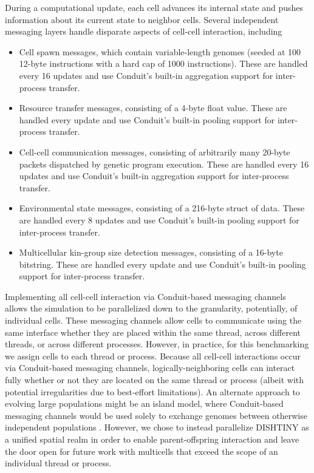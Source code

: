 During a computational update, each cell advances its internal state and pushes information about its current state to neighbor cells.
Several independent messaging layers handle disparate aspects of cell-cell interaction, including
\begin{itemize}
  \item Cell spawn messages, which contain variable-length genomes (seeded at 100 12-byte instructions with a hard cap of 1000 instructions). These are handled every 16 updates and use Conduit's built-in aggregation support for inter-process transfer.
  \item Resource transfer messages, consisting of a 4-byte float value. These are handled every update and use Conduit's built-in pooling support for inter-process transfer.
  \item Cell-cell communication messages, consisting of arbitrarily many 20-byte packets dispatched by genetic program execution. These are handled every 16 updates and use Conduit's built-in aggregation support for inter-process transfer.
  \item Environmental state messages, consisting of a 216-byte struct of data. These are handled every 8 updates and use Conduit's built-in pooling support for inter-process transfer.
  \item Multicellular kin-group size detection messages, consisting of a 16-byte bitstring. These are handled every update and use Conduit's built-in pooling support for inter-process transfer.
\end{itemize}

Implementing all cell-cell interaction via Conduit-based messaging channels allows the simulation to be parallelized down to the granularity, potentially, of individual cells.
These messaging channels allow cells to communicate using the same interface whether they are placed within the same thread, across different threads, or across different processes.
However, in practice, for this benchmarking we assign  cells to each thread or process.
Because all cell-cell interactions occur via Conduit-based messaging channels, logically-neighboring cells can interact fully whether or not they are located on the same thread or process (albeit with potential irregularities due to best-effort limitations).
An alternate approach to evolving large populations might be an island model, where Conduit-based messaging channels would be used solely to exchange genomes between otherwise independent populations \citep{bennett1999building}.
However, we chose to instead parallelize DISHTINY as a unified spatial realm in order to enable parent-offspring interaction and leave the door open for future work with multicells that exceed the scope of an individual thread or process.
